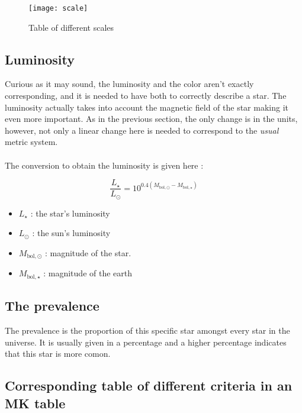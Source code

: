 \documentclass[a4paper, 11pt]{article} %
\begin{document}
\newpage

\begin{figure}[h]
\centering
\texttt{[image: scale]}
\caption{Table of different scales}
\end{figure}



\subsection{Luminosity}

Curious as it may sound, the luminosity and the color aren't exactly corresponding, and it is needed to have both to correctly describe a star. The luminosity actually takes into account the magnetic field of the star making it even more important. As in the previous section, the only change is in the units, however, not only a linear change here is needed to correspond to the \textit{usual} metric system.
\paragraph*{}
The conversion to obtain the luminosity is given here :
\begin{multicols}{2}

\begin{equation}
\frac{L_\star}{L_\odot} = 10^{0.4\left(M_\mathrm{bol,\odot} - M_\mathrm{bol,\star}\right)}
\end{equation}
\vspace{2cm}
\begin{itemize}
\item $L_\star$ : the star's luminosity
\item $L_\odot$ : the sun's luminosity
\item $M_\mathrm{bol,\odot}$ : magnitude of the star.
\item $M_\mathrm{bol,\star}$ : magnitude of the earth
\end{itemize}
\end{multicols}

\subsection{The prevalence}

The prevalence is the proportion of this specific star amongst every star in the universe. It is usually given in a percentage and a higher percentage indicates that this star is more comon.	
\newpage
\subsection{Corresponding table of different criteria in an MK table}
\end{document}
